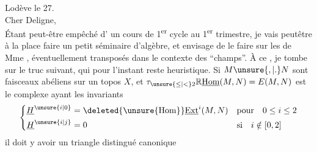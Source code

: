 
\noindent\hfill Lodève le 27.\\
Cher Deligne,\\
Étant peut-être empêché   d' un cours de 1\textsuperscript{er} cycle au 1\textsuperscript{er} trimestre, je vais peutêtre à la place faire un petit séminaire d'algèbre, et envisage de le faire sur les  de Mme , éventuellement transposés dans le contexte des ``champs''. À ce , je tombe sur le truc suivant, qui pour l'instant reste heuristique. Si $M\unsure{,|.}N$ sont  faisceaux abéliens sur un topos $X$, et $\tau_{\unsure{\leq|<}2}\mathbb{R}\underline{\mathrm{Hom}}(M,N)=E(M,N)$ est le complexe ayant les invariants
\[
\left\{\begin{aligned}
\underline{H}^{\unsure{i|0}} &= \deleted{\unsure{\mathrm{Hom}}}\underline{\mathrm{Ext}}^{i}(M,N)  && \text{pour}\quad 0\leq i\leq 2\\
\underline{H}^{\unsure{i|j}} &= 0 && \text{si}\quad i\notin[0,2]
\end{aligned}\right.
\]
il doit y avoir un triangle distingué canonique


